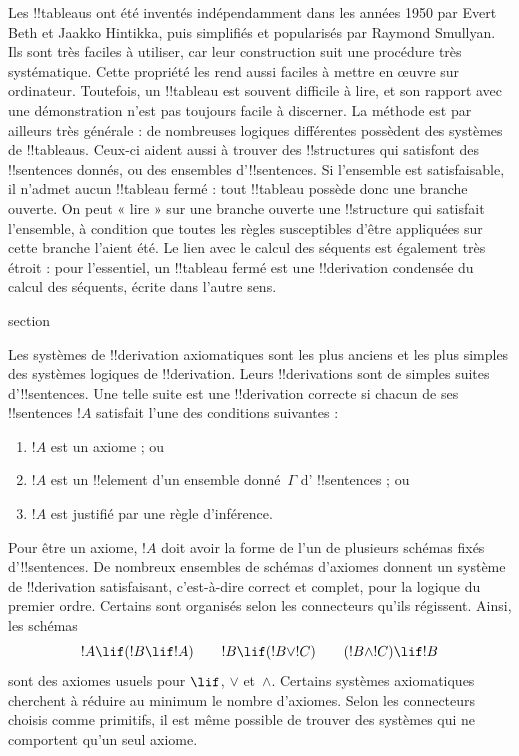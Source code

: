 \documentclass[11pt,a4paper,openany]{memoir}
\begin{document}
Les !!{tableau}s ont été inventés indépendamment dans les années 1950
par Evert Beth et Jaakko Hintikka, puis simplifiés et popularisés par
Raymond Smullyan. Ils sont très faciles à utiliser, car leur construction
suit une procédure très systématique. Cette propriété les rend aussi
faciles à mettre en œuvre sur ordinateur. Toutefois, un !!{tableau}
est souvent difficile à lire, et son rapport avec une démonstration
n'est pas toujours facile à discerner. La méthode est par ailleurs très
générale : de nombreuses logiques différentes possèdent des systèmes de
!!{tableau}s. Ceux-ci aident aussi à trouver des !!{structure}s qui
satisfont des !!{sentence}s donnés, ou des ensembles d'!!{sentence}s.
Si l'ensemble est satisfaisable, il n'admet aucun !!{tableau} fermé :
tout !!{tableau} possède donc une branche ouverte. On peut « lire »
sur une branche ouverte une !!{structure} qui satisfait l'ensemble,
à condition que toutes les règles susceptibles d'être appliquées sur
cette branche l'aient été. Le lien avec le calcul des séquents est
également très étroit : pour l'essentiel, un !!{tableau} fermé est une
!!{derivation} condensée du calcul des séquents, écrite dans l'autre sens.


\endgroup



\begingroup
\expandafter\def\csname ol@sectioncs\endcsname{section}
\def\olfilename{axiomatic-deduction}


      {}
      {}


Les systèmes de !!{derivation} axiomatiques sont les plus anciens et
les plus simples des systèmes logiques de !!{derivation}. Leurs
!!{derivation}s sont de simples suites d'!!{sentence}s. Une telle
suite est une !!{derivation} correcte si chacun de ses !!{sentence}s
$!A$ satisfait l'une des conditions suivantes :
\begin{enumerate}
\item $!A$ est un axiome ; ou
\item $!A$ est un !!{element} d'un ensemble donné~$\Gamma$ d'%
  !!{sentence}s ; ou
\item $!A$ est justifié par une règle d'inférence.
\end{enumerate}
Pour être un axiome, $!A$ doit avoir la forme de l'un de plusieurs
schémas fixés d'!!{sentence}s. De nombreux ensembles de schémas
d'axiomes donnent un système de !!{derivation} satisfaisant, c'est-à-dire
correct et complet, pour la logique du premier ordre. Certains sont
organisés selon les connecteurs qu'ils régissent. Ainsi, les schémas
\[
!A \lif (!B \lif !A) \qquad !B \lif (!B \lor !C) \qquad (!B \land !C) \lif !B
\]
sont des axiomes usuels pour $\lif$, $\lor$ et~$\land$.
Certains systèmes axiomatiques cherchent à réduire au minimum le nombre
d'axiomes. Selon les connecteurs choisis comme primitifs, il est même
possible de trouver des systèmes qui ne comportent qu'un seul axiome.
\end{document}
